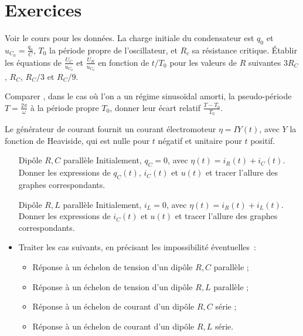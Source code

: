 \section{Exercices}%
\begin{exercice}%
  Voir le cours pour les données. La charge initiale du condensateur est 
  \(q_0\) et \(u_{C_0} = \frac{q_0}{C}\), \(T_0\) la période propre de 
  l'oscillateur, et \(R_c\) sa résistance critique. Établir les équations de 
  \(\frac{U_C}{u_{C_0}}\) et \(\frac{U_R}{u_{C_0}}\) en fonction de \(t/T_0\) 
  pour les valeurs de \(R\) suivantes \(3R_C\), \(R_C\), \(R_C/3\) et 
  \(R_C/9\).

  Comparer , dans le cas où l'on a un régime sinusoïdal amorti, la 
  pseudo-période \(T=\frac{2\pi}{\omega}\) à la période propre \(T_0\), donner 
  leur écart relatif \(\frac{T-T_0}{T_0}\).
\end{exercice}%
\begin{exercice}%
  Le générateur de courant fournit un courant électromoteur \(\eta = I Y(t)\), 
  avec \(Y\) la fonction de Heaviside, qui est nulle pour \(t\) négatif et 
  unitaire pour \(t\) positif.
  \begin{itemize}
    \item[Dipôle \(R, C\) parallèle] Initialement, \(q_C=0\), avec \(\eta(t) = 
      i_R(t)+i_C(t)\). Donner les expressions de \(q_C(t)\), \(i_C(t)\) et 
      \(u(t)\) et tracer l'allure des graphes correspondants.
    \item[Dipôle \(R, L\) parallèle] Initialement, \(i_L=0\), avec \(\eta(t) = 
      i_R(t)+i_L(t)\). Donner les expressions de \(i_C(t)\) et \(u(t)\) et 
      tracer l'allure des graphes correspondants.
    \item Traiter les cas suivants, en précisant les impossibilité 
      éventuelles~:
      \begin{itemize}
        \item Réponse à un échelon de tension d'un dipôle \(R, C\) parallèle ;
        \item Réponse à un échelon de tension d'un dipôle \(R, L\) parallèle ;
        \item Réponse à un échelon de courant d'un dipôle \(R, C\) série ;
        \item Réponse à un échelon de courant d'un dipôle \(R, L\) série.
      \end{itemize}
  \end{itemize}
\end{exercice}%
